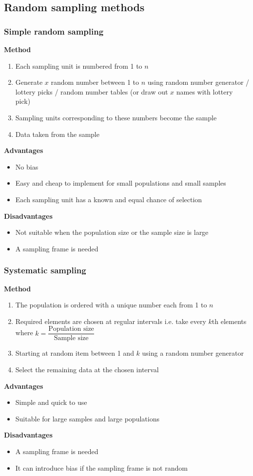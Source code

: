 \documentclass[A4paper]{article}
\begin{document}
	
	\subsection{Random sampling methods}
	\subsubsection{Simple random sampling}
	\textbf{Method}
	\begin{enumerate}
		\item Each sampling unit is numbered from 1 to $n$
		\item Generate $x$ random number between 1 to $n$ using random number generator / lottery picks / random number tables (or draw out $x$ names with lottery pick)
		\item Sampling units corresponding to these numbers become the sample
		\item Data taken from the sample
	\end{enumerate}
	\textbf{Advantages}
	\begin{itemize}
		\item No bias
		\item Easy and cheap to implement for small populations and small samples
		\item Each sampling unit has a known and equal chance of selection
	\end{itemize}
	\textbf{Disadvantages}
	\begin{itemize}
		\item Not suitable when the population size or the sample size is large
		\item A sampling frame is needed
	\end{itemize}
	\subsubsection{Systematic sampling}
	\textbf{Method}
	\begin{enumerate}
		\item The population is ordered with a unique number each from 1 to $n$
		\item Required elements are chosen at regular intervals i.e. take every $k$th elements where $k=\dfrac{\text{Population size}}{\text{Sample size}}$
		\item Starting at random item between 1 and $k$ using a random number generator
		\item Select the remaining data at the chosen interval
	\end{enumerate}
	\textbf{Advantages}
	\begin{itemize}
		\item Simple and quick to use
		\item Suitable for large samples and large populations
	\end{itemize}
	\textbf{Disadvantages}
	\begin{itemize}
		\item A sampling frame is needed
		\item It can introduce bias if the sampling frame is not random
	\end{itemize}
\end{document}
